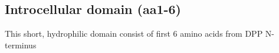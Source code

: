 \subsection{Introcellular domain (aa1-6)}

This short, hydrophilic domain consist of first 6 amino acids from DPP N-terminus